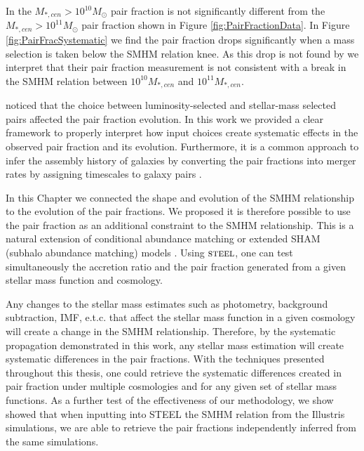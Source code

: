 In \citet{Mundy2017A3.5} the $M_{*,cen} > 10^{10} M_{\odot}$ pair fraction is not significantly different from the $M_{*,cen} > 10^{11} M_{\odot}$ pair fraction shown in Figure \ref{fig:PairFractionData}. In Figure \ref{fig:PairFracSystematic} we find the pair fraction drops significantly when a mass selection is taken below the SMHM relation knee. As this drop is not found by \citet{Mundy2017A3.5} we interpret that their pair fraction measurement is not consistent with a break in the SMHM relation between $10^{10} M_{*,cen}$ and $10^{11} M_{*,cen}$.

\citet{Man2016RESOLVING03} noticed that the choice between luminosity-selected and stellar-mass selected pairs affected the pair fraction evolution. In this work we provided a clear framework to properly interpret how input choices create systematic effects in the observed pair fraction and its evolution. Furthermore, it is a common approach to infer the assembly history of galaxies by converting the pair fractions into merger rates by assigning timescales to galaxy pairs \citep{Conselice20033,Conselice2008TheField,Mundy2017A3.5}. 

In this Chapter we connected the shape and evolution of the SMHM relationship to the evolution of the pair fractions.
We proposed it is therefore possible to use the pair fraction as an additional constraint to the SMHM relationship. This is a natural extension of conditional abundance matching or extended SHAM (subhalo abundance matching) models \citep{Hearin2013SHAMGroups}.
Using $\textsc{steel}$, one can test simultaneously the accretion ratio and the pair fraction generated from a given stellar mass function and cosmology.

Any changes to the stellar mass estimates such as photometry, background subtraction, IMF, e.t.c. that affect the stellar mass function in a given cosmology will create a change in the SMHM relationship. Therefore, by the systematic propagation demonstrated in this work, any stellar mass estimation will create systematic differences in the pair fractions. 
With the techniques presented throughout this thesis, one could retrieve the systematic differences created in pair fraction under multiple \LCDM cosmologies and for any given set of stellar mass functions. As a further test of the effectiveness of our methodology, we show showed that when inputting into STEEL the SMHM relation from the Illustris simulations, we are able to retrieve the pair fractions independently inferred from the same simulations.

